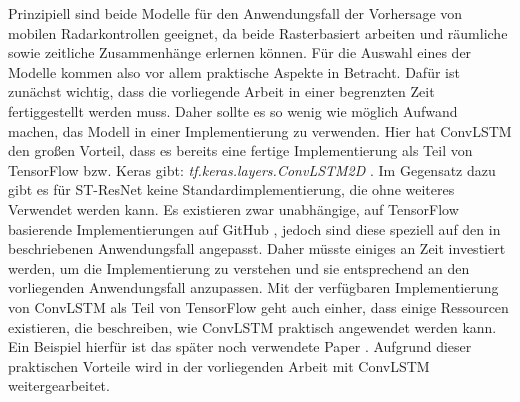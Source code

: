 Prinzipiell sind beide Modelle für den Anwendungsfall der Vorhersage von mobilen Radarkontrollen geeignet, da beide Rasterbasiert arbeiten und räumliche sowie zeitliche Zusammenhänge erlernen können.
Für die Auswahl eines der Modelle kommen also vor allem praktische Aspekte in Betracht.
Dafür ist zunächst wichtig, dass die vorliegende Arbeit in einer begrenzten Zeit fertiggestellt werden muss.
Daher sollte es so wenig wie möglich Aufwand machen, das Modell in einer Implementierung zu verwenden.
Hier hat ConvLSTM den großen Vorteil, dass es bereits eine fertige Implementierung als Teil von TensorFlow bzw. Keras gibt: \emph{tf.keras.layers.ConvLSTM2D} \cite{DocConvLSTM2D}.
Im Gegensatz dazu gibt es für ST-ResNet keine Standardimplementierung, die ohne weiteres Verwendet werden kann.
Es existieren zwar unabhängige, auf TensorFlow basierende Implementierungen auf GitHub \cite{STResNetImpl, STResNetImpl2}, jedoch sind diese speziell auf den in \cite{STResNetOriginal} beschriebenen Anwendungsfall angepasst.
Daher müsste einiges an Zeit investiert werden, um die Implementierung zu verstehen und sie entsprechend an den vorliegenden Anwendungsfall anzupassen.
Mit der verfügbaren Implementierung von ConvLSTM als Teil von TensorFlow geht auch einher, dass einige Ressourcen existieren, die beschreiben, wie ConvLSTM praktisch angewendet werden kann.
Ein Beispiel hierfür ist das später noch verwendete Paper \cite{CrimeConvLSTM}.
Aufgrund dieser praktischen Vorteile wird in der vorliegenden Arbeit mit ConvLSTM weitergearbeitet.
